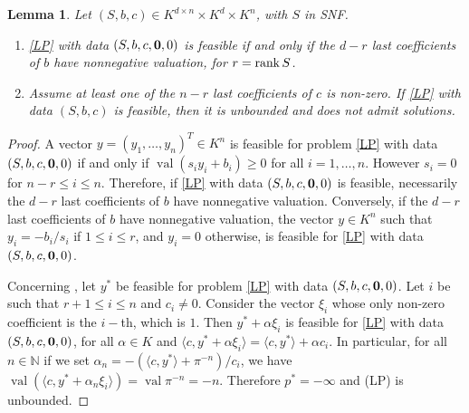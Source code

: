 \documentclass[sigconf]{acmart}
\newtheorem{lemma}[theorem]{Lemma}
\DeclareMathOperator{\val}{val}
\begin{document}
\begin{lemma}\label{prop:reduc}
  Let $(S,b,c) \in K^{d\times n} \times K^d \times K^n$, with $S$ in SNF.
  \begin{enumerate}
  \item \label{prop:reduc_it1}
    \eqref{LP} with data $(S,b,c,{\bf 0},0)$ is feasible if and only if the $d-r$ last coefficients
    of $b$ have nonnegative valuation, for $r = {\rm rank}\,S$.
  \item \label{prop:reduc_it2}
    Assume at least one of the $n-r$ last coefficients
    of $c$ is non-zero. If \eqref{LP} with
    data $(S,b,c)$ is feasible, then it is unbounded and does not admit solutions.
  \end{enumerate}
\end{lemma}
\begin{proof}
  A vector $y = (y_1, \ldots, y_n)^T \in K^n$ is feasible for problem \eqref{LP} with data
  $(S,b,c,{\bf 0}, 0)$ if and only if $\val(s_i y_i + b_i) \geq 0$ for all $i = 1,\ldots,n$.
  However $s_i = 0$ for $n-r \leq i\leq n$. Therefore, if \eqref{LP} with data $(S,b,c,{\bf 0},0)$
  is feasible,
  necessarily the $d-r$ last coefficients of $b$ have nonnegative valuation.
  Conversely, if the $d-r$ last coefficients of $b$ have nonnegative valuation,
  the vector $y \in K^n$ such that
  $y_i = {-b_i}/{s_i}$ if $1 \leq i \leq r$, and $y_i =0$ otherwise, is feasible for \eqref{LP}
  with data $(S,b,c,{\bf 0},0)$.

  Concerning , let $y^*$ be feasible for problem \eqref{LP} with data
  $(S,b,c,{\bf 0},0)$.
  Let $i$ be such that $r+1 \leq i \leq n$ and $c_i \neq 0$. Consider the vector $\xi_i$ whose
  only non-zero
  coefficient is the $i-$th, which is $1$. Then $y^* + \alpha \xi_i$ is feasible for \eqref{LP}
  with data
  $(S,b,c,{\bf 0},0)$, for all $\alpha \in K$ and $\langle c, y^* + \alpha \xi_i\rangle =
  \langle c, y^* \rangle + \alpha c_i$.
  In particular, for all $n \in \mathbb{N}$ if we set $\alpha_n = -({\langle c, y^* \rangle +
    \pi^{-n}})/{c_i}$,
  we have $\val \left(\langle c, y^* + \alpha_n \xi_i \rangle\right) = \val \pi^{-n} = -n$.
  Therefore $p^* = -\infty$ and (LP) is unbounded.
\end{proof}

\end{document}
